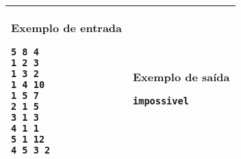 \begin{table}[!h]
\centering
\begin{tabular}{|l|l|}
\hline
\begin{minipage}[t]{3in}
\textbf{Exemplo de entrada}
\begin{verbatim}
5 8 4
1 2 3
1 3 2
1 4 10
1 5 7
2 1 5
3 1 3
4 1 1
5 1 12
4 5 3 2
\end{verbatim}
\vspace{1mm}
\end{minipage}
&

\begin{minipage}[t]{3in}
\textbf{Exemplo de saída}
\begin{verbatim}
impossivel
\end{verbatim}
\vspace{1mm}
\end{minipage} \\
\hline
\end{tabular}
\end{table}
